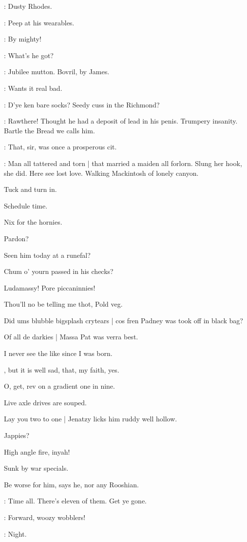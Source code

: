 \lenehan:
Dusty Rhodes.

\lynch:
Peep at his wearables.

\crotthers:
By mighty!

\stephen:
What's he got?

\dixon:
Jubilee mutton.
Bovril,
by James.

\lenehan:
Wants it real bad.

\crotthers:
D'ye ken bare socks?
Seedy cuss in the Richmond?

\dixon:
Rawthere!
Thought he had a deposit of lead in his penis.
Trumpery insanity.
Bartle the Bread we calls him.

\lynch:
That,
sir,
was once a prosperous cit.

\Bloom:
Man all tattered and torn |
that married a maiden all forlorn.
Slung her hook,
she did.
Here see lost love.
Walking Mackintosh of lonely canyon.

Tuck and turn in.

Schedule time.

Nix for the hornies.

Pardon?

Seen him today at a runefal?

Chum o' yourn passed in his checks?

Ludamassy!
Pore piccaninnies!

Thou'll no be telling me thot,
Pold veg.

Did ums blubble bigsplash crytears |
cos fren Padney was took off in black bag?

Of all de darkies |
Massa Pat was verra best.

I never see the like since I was born.

,
but it is well sad,
that,
my faith,
yes.

O,
get,
rev on a gradient one in nine.

Live axle drives are souped.

Lay you two to one |
Jenatzy licks him ruddy well hollow.

Jappies?

High angle fire,
inyah!

Sunk by war specials.

Be worse for him,
says he,
nor any Rooshian.

\barman:
Time all.
There's eleven of them.
Get ye gone.

\lenehan:
Forward,
woozy wobblers!

\lynch:
Night.

